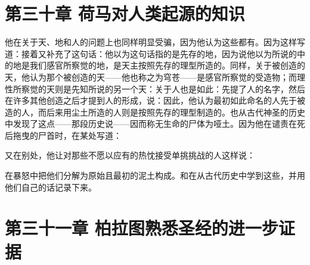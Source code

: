 
\section{第三十章 荷马对人类起源的知识}

他在关于天、地和人的问题上也同样明显受骗，因为他认为这些都有。因为这样写道：接着又补充了这句话：他以为这句话指的是先存的地，因为说他以为所说的中的地是我们感官所察觉的地，是天主按照先存的理型所造的。同样，关于被创造的天，他认为那个被创造的天——他也称之为穹苍——是感官所察觉的受造物；而理性所察觉的天则是先知所说的另一个天：关于人也是如此：先提了人的名字，然后在许多其他创造之后才提到人的形成，说：因此，他认为最初如此命名的人先于被造的人，而后来用尘土所造的人则是按照先存的理型制造的。也从古代神圣的历史中发现了这点——那段历史说——因而称无生命的尸体为哑土。因为他在谴责在死后拖曳的尸首时，在某处写道：\par

\par

又在别处，他让对那些不愿以应有的热忱接受单挑挑战的人这样说：\par

\par

在暴怒中把他们分解为原始且最初的泥土构成。和在从古代历史中学到这些，并用他们自己的话记录下来。\par


\section{第三十一章 柏拉图熟悉圣经的进一步证据}

